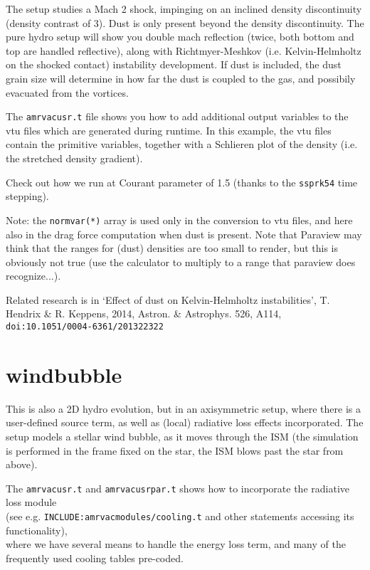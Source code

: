 \documentclass[10pt]{article}
\begin{document}
The setup studies a Mach 2 shock, impinging on an inclined density discontinuity (density contrast of 3). Dust is only present beyond the density discontinuity. The pure hydro setup will show you double mach reflection (twice, both bottom and top are handled reflective), along with Richtmyer-Meshkov (i.e. Kelvin-Helmholtz on the shocked contact) instability development. If dust is included, the dust grain size will determine in how far the dust is coupled to the gas, and possibily evacuated from the vortices.

The {\tt amrvacusr.t} file shows you how to add additional output variables to the vtu files which are generated during runtime. In this example, the vtu files contain the primitive variables, together with a Schlieren plot of the density (i.e. the stretched density gradient).

Check out how we run at Courant parameter of 1.5 (thanks to the {\tt ssprk54} time stepping).

Note: the {\tt normvar(*)} array is used only in the conversion to vtu files, and here also in the drag force computation when dust is present. Note that Paraview may think that the ranges for (dust) densities are too small to render, but this is obviously not true (use the calculator to multiply to a range that paraview does recognize...).

Related research is in `Effect of dust on Kelvin-Helmholtz instabilities', T. Hendrix \& R. Keppens, 2014, Astron. \& Astrophys. 526, A114, {\tt doi:10.1051/0004-6361/201322322}

\section*{windbubble}

This is also a 2D hydro evolution, but in an axisymmetric setup, where there is a user-defined source term, as well as (local) radiative loss effects incorporated. The setup models a stellar wind bubble, as it moves through the ISM (the simulation is performed in the frame fixed on the star, the ISM blows past the star from above). 

The {\tt amrvacusr.t} and {\tt amrvacusrpar.t} shows how to incorporate the radiative loss module \hfill \\
(see e.g. {\tt INCLUDE:amrvacmodules/cooling.t} and other statements accessing its functionality), \hfill \\
where we have several means to handle the energy loss term, and many of the frequently used cooling tables pre-coded.
\end{document}
